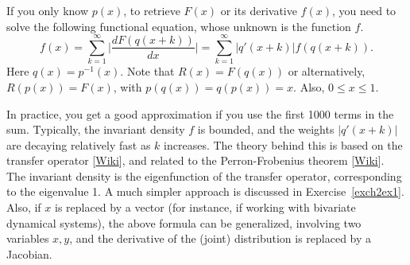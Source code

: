 \documentclass[oneside,10pt]{book}
\begin{document}
If you only know $p(x)$, to retrieve $F(x)$ or its derivative $f(x)$, you need to solve the following functional equation, whose unknown is the function $f$.
\begin{equation}
f(x)=\sum_{k=1}^\infty \Bigg| \frac{dF(q(x+k))}{dx} \Bigg| = \sum_{k=1}^\infty |q'(x+k)| f(q(x+k)).\label{ch2eq2}
\end{equation}
Here $q(x)=p^{-1}(x)$. Note that $R(x) = F(q(x))$ or alternatively, $R(p(x)) = F(x)$, with $p(q(x)) = q(p(x)) = x$. Also, $0\leq x\leq 1$.

In practice, you get a good approximation if you use the first 1000 terms in the sum. Typically, the invariant density $f$ is bounded, and the weights $|q'(x+k)|$ are decaying relatively fast as $k$ increases.
The theory behind this is based on the
\textcolor{index}{transfer operator} [\href{https://en.wikipedia.org/wiki/Transfer_operator}{Wiki}], and related to
the \textcolor{index}{Perron-Frobenius theorem} [\href{https://en.wikipedia.org/wiki/Perron\%E2\%80\%93Frobenius_theorem}{Wiki}].
The invariant density is the eigenfunction of the transfer operator, corresponding to the eigenvalue 1. A much simpler approach is discussed in Exercise~\ref{exch2ex1}. Also, if $x$ is replaced by a vector (for instance, if working with bivariate dynamical systems), the above formula can be generalized, involving two variables $x, y$, and the derivative of the (joint) distribution is replaced by a Jacobian.
\end{document}
